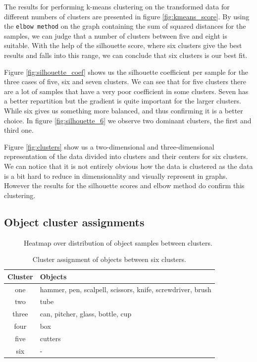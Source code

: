 The results for performing k-means clustering on the transformed data for different numbers of clusters are presented in figure \ref{fig:kmeans_score}. By using the \texttt{elbow method} on the graph containing the sum of squared distances for the samples, we can judge that a number of clusters between five and eight is suitable. With the help of the silhouette score, where six clusters give the best results and falls into this range, we can conclude that six clusters is our best fit.

Figure \ref{fig:silhouette_coef} shows us the silhouette coefficient per sample for the three cases of five, six and seven clusters. We can see that for five clusters there are a lot of samples that have a very poor coefficient in some clusters. Seven has a better repartition but the gradient is quite important for the larger clusters. While six gives us something more balanced, and thus confirming it is a better choice. In figure \ref{fig:silhouette_6} we observe two dominant clusters, the first and third one.

Figure \ref{fig:clusters} show us a two-dimensional and three-dimensional representation of the data divided into clusters and their centers for six clusters. We can notice that it is not entirely obvious how the data is clustered as the data is a bit hard to reduce in dimensionality and visually represent in graphs. However the results for the silhouette scores and elbow method do confirm this clustering.


\subsection{Object cluster assignments}

\begin{figure}
	
	\caption{Heatmap over distribution of object samples between clusters.}
	\label{fig:obj_sample_heatmap}
\end{figure}

\begin{table}
	\begin{tabular}{|c|l|}
		\hline
		Cluster & Objects \\
		\hline
		one   & hammer, pen, scalpell, scissors, knife, screwdriver, brush \\
		two   & tube \\
		three & can, pitcher, glass, bottle, cup \\
		four  & box \\
		five  & cutters \\
		six   & - \\
		\hline
	\end{tabular}
	\caption{Cluster assignment of objects between six clusters.}
	\label{tab:object_cluster_assign}
\end{table}

